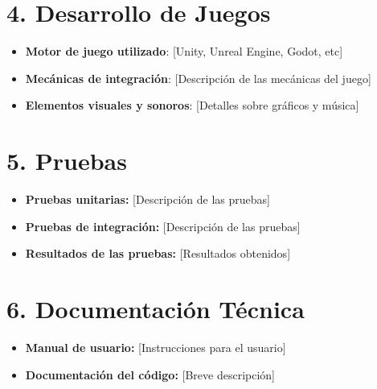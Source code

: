 \documentclass[12pt, a4paper]{article}
\begin{document}
\section*{4. Desarrollo de Juegos}

\begin{itemize}
    \item \textbf{Motor de juego utilizado}: [Unity, Unreal Engine, Godot, etc]
    \item \textbf{Mecánicas de integración}: [Descripción de las mecánicas del juego]
    \item \textbf{Elementos visuales y sonoros}: [Detalles sobre gráficos y música]
\end{itemize}
\section*{5. Pruebas}
\begin{itemize}
    \item \textbf{Pruebas unitarias:} [Descripción de las pruebas]
    \item \textbf{Pruebas de integración:} [Descripción de las pruebas]
    \item \textbf{Resultados de las pruebas:} [Resultados obtenidos]
\end{itemize}

\section*{6. Documentación Técnica}
\begin{itemize}
    \item \textbf{Manual de usuario:} [Instrucciones para el usuario]
    \item \textbf{Documentación del código:} [Breve descripción]
\end{itemize}
\end{document}
